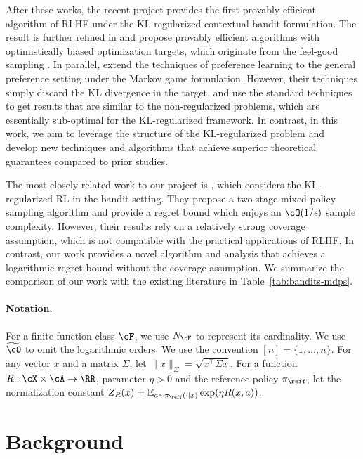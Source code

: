 \documentclass[11pt]{article}
\newcommand{\E}{\mathbb E}
\begin{document}
After these works, the recent project \citet{xiong2024iterative} provides the first provably efficient algorithm of RLHF under the KL-regularized contextual bandit formulation. The result is further refined in \citep{xie2024exploratory} and \citet{xie2024exploratory, liu2024provably, cen2024value} propose provably efficient algorithms with optimistically biased optimization targets, which originate from the feel-good sampling \citep{zhang2022feel}. In parallel, \citet{wang2023rlhf, ye2024theoretical} extend the techniques of preference learning to the general preference setting under the Markov game formulation. However, their techniques simply discard the KL divergence in the target, and use the standard techniques to get results that are similar to the non-regularized problems, which are essentially sub-optimal for the KL-regularized framework. In contrast, in this work, we aim to leverage the structure of the KL-regularized problem and develop new techniques and algorithms that achieve superior theoretical guarantees compared to prior studies.

The most closely related work to our project is \citet{zhao2024sharp}, which considers the KL-regularized RL in the bandit setting. They propose a two-stage mixed-policy sampling algorithm and provide a regret bound which enjoys an $\cO(1 / \epsilon)$ sample complexity. However, their results rely on a relatively strong coverage assumption, which is not compatible with the practical applications of RLHF. In contrast, our work provides a novel algorithm and analysis that achieves a logarithmic regret bound without the coverage assumption. We summarize the comparison of our work with the existing literature in Table~\ref{tab:bandits-mdps}.

\paragraph{Notation.} For a finite function class $\cF$, we use $N_\cF$ to represent its cardinality. We use $\widetilde{\cO}$ to omit the logarithmic orders. We use the convention $[n]=\{1,\ldots,n\}$. For any vector $x$ and a matrix $\Sigma$, let $\|x\|_\Sigma=\sqrt{x^{\top}\Sigma x}$. For a function $R:\cX\times\cA\rightarrow\RR$, parameter $\eta>0$ and the reference policy $\pi_{\reff}$, let the normalization constant $Z_R(x)=\E_{a \sim \pi_{\reff}(\cdot|x)} \exp (\eta R(x,a))$.

\section{Background}
\end{document}
